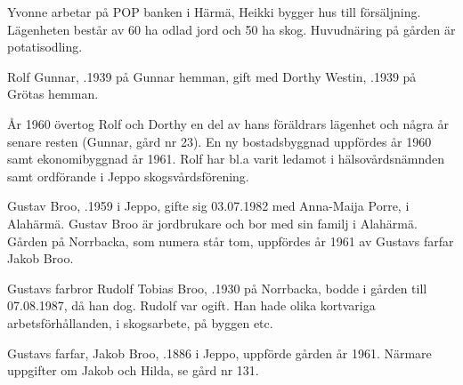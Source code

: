 Yvonne arbetar på POP banken i Härmä, Heikki bygger hus till försäljning. Lägenheten består av 60 ha odlad jord och 50 ha skog. Huvudnäring på gården är potatisodling.


Rolf Gunnar, .1939 på Gunnar hemman, gift med Dorthy Westin, .1939 på Grötas hemman.
\begin{jhchildren}
  \item {}
  \item {}
\end{jhchildren}

År 1960 övertog Rolf och Dorthy en del av hans föräldrars lägenhet och några år senare resten (Gunnar, gård nr 23). En ny bostadsbyggnad uppfördes år 1960 samt ekonomibyggnad år 1961. Rolf har bl.a varit ledamot i hälsovårdsnämnden samt ordförande i Jeppo skogsvårdsförening.






Gustav Broo,  .1959 i Jeppo, gifte sig 03.07.1982 med Anna-Maija Porre,  i Alahärmä. Gustav Broo är jordbrukare och bor med sin familj i Alahärmä. Gården på Norrbacka, som numera står tom, uppfördes år 1961 av Gustavs farfar Jakob Broo.
\begin{jhchildren}
  \item {}
  \item {}
  \item {}
  \item {}
\end{jhchildren}


Gustavs farbror Rudolf Tobias Broo, .1930 på Norrbacka, bodde i gården till 07.08.1987, då han dog. Rudolf var ogift. Han hade olika kortvariga arbetsförhållanden, i skogsarbete, på byggen etc.


Gustavs farfar, Jakob Broo, .1886 i Jeppo, uppförde gården år 1961. Närmare uppgifter om Jakob och Hilda, se gård nr 131.


